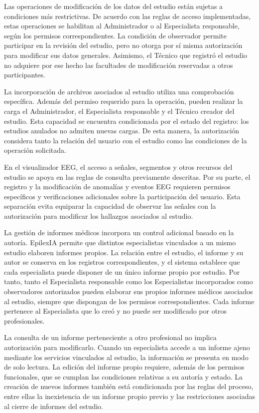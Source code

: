 Las operaciones de modificación de los datos del estudio están sujetas a condiciones más restrictivas. De acuerdo con las reglas de acceso implementadas, estas operaciones se habilitan al Administrador o al Especialista responsable, según los permisos correspondientes. La condición de observador permite participar en la revisión del estudio, pero no otorga por sí misma autorización para modificar sus datos generales. Asimismo, el Técnico que registró el estudio no adquiere por ese hecho las facultades de modificación reservadas a otros participantes.

La incorporación de archivos asociados al estudio utiliza una comprobación específica. Además del permiso requerido para la operación, pueden realizar la carga el Administrador, el Especialista responsable y el Técnico creador del estudio. Esta capacidad se encuentra condicionada por el estado del registro: los estudios anulados no admiten nuevas cargas. De esta manera, la autorización considera tanto la relación del usuario con el estudio como las condiciones de la operación solicitada.

En el visualizador EEG, el acceso a señales, segmentos y otros recursos del estudio se apoya en las reglas de consulta previamente descritas. Por su parte, el registro y la modificación de anomalías y eventos EEG requieren permisos específicos y verificaciones adicionales sobre la participación del usuario. Esta separación evita equiparar la capacidad de observar las señales con la autorización para modificar los hallazgos asociados al estudio.

La gestión de informes médicos incorpora un control adicional basado en la autoría. EpilexIA permite que distintos especialistas vinculados a un mismo estudio elaboren informes propios. La relación entre el estudio, el informe y su autor se conserva en los registros correspondientes, y el sistema establece que cada especialista puede disponer de un único informe propio por estudio. Por tanto, tanto el Especialista responsable como los Especialistas incorporados como observadores autorizados pueden elaborar sus propios informes médicos asociados al estudio, siempre que dispongan de los permisos correspondientes. Cada informe pertenece al Especialista que lo creó y no puede ser modificado por otros profesionales.


La consulta de un informe perteneciente a otro profesional no implica autorización para modificarlo. Cuando un especialista accede a un informe ajeno mediante los servicios vinculados al estudio, la información se presenta en modo de solo lectura. La edición del informe propio requiere, además de los permisos funcionales, que se cumplan las condiciones relativas a su autoría y estado. La creación de nuevos informes también está condicionada por las reglas del proceso, entre ellas la inexistencia de un informe propio previo y las restricciones asociadas al cierre de informes del estudio.

